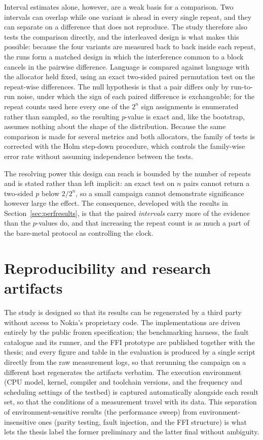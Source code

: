 \documentclass[english,twoside,openright,a4paper,censored,csm,software-track-2020]{HYthesisML}
\begin{document}
Interval estimates alone, however, are a weak basis for a comparison. Two intervals can overlap
while one variant is ahead in every single repeat, and they can separate on a difference that
does not reproduce. The study therefore also tests the comparison directly, and the interleaved
design is what makes this possible: because the four variants are measured back to back inside
each repeat, the runs form a matched design in which the interference common to a block cancels
in the pairwise difference. Language is compared against language with the allocator held
fixed, using an exact two-sided paired permutation test on the repeat-wise differences. The
null hypothesis is that a pair differs only by run-to-run noise, under which the sign of each
paired difference is exchangeable; for the repeat counts used here every one of the $2^{n}$
sign assignments is enumerated rather than sampled, so the resulting $p$-value is exact and,
like the bootstrap, assumes nothing about the shape of the distribution. Because the same
comparison is made for several metrics and both allocators, the family of tests is corrected
with the Holm step-down procedure, which controls the family-wise error rate without assuming
independence between the tests.

The resolving power this design can reach is bounded by the number of repeats and is stated
rather than left implicit: an exact test on $n$ pairs cannot return a two-sided $p$ below
$2/2^{n}$, so a small campaign cannot demonstrate significance however large the effect. The
consequence, developed with the results in Section~\ref{sec:perfresults}, is that the paired
\emph{intervals} carry more of the evidence than the $p$-values do, and that increasing the
repeat count is as much a part of the bare-metal protocol as controlling the clock.

\section{Reproducibility and research artifacts}
The study is designed so that its results can be regenerated by a third party without access to
Nokia's proprietary code. The implementations are driven entirely by the public frozen
specification; the benchmarking harness, the fault catalogue and its runner, and the FFI
prototype are published together with the thesis; and every figure and table in the evaluation
is produced by a single script directly from the raw measurement logs, so that rerunning the
campaign on a different host regenerates the artifacts verbatim. The execution environment (CPU
model, kernel, compiler and toolchain versions, and the frequency and scheduling settings of
the testbed) is captured automatically alongside each result set, so that the conditions of a
measurement travel with its data. This separation of environment-sensitive results (the
performance sweep) from environment-insensitive ones (parity testing, fault injection, and the
FFI structure) is what lets the thesis label the former preliminary and the latter final
without ambiguity.
\end{document}
